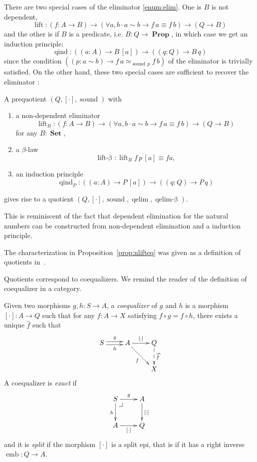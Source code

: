 \documentclass[envcountsame]{llncs}
\makeatletter
\providecommand{\class}[1]{[#1]}
\newcommand{\dlift}[1]{\widehat{#1}}
\DeclareMathOperator{\Prop}{\mathbf{Prop}}
\DeclareMathOperator{\Set}{\mathbf{Set}}
\DeclareMathOperator{\sound}{sound}
\DeclareMathOperator{\qelimbeta}{qelim-\beta}
\DeclareMathOperator{\qind}{qind}
\DeclareMathOperator{\emb}{emb}
\DeclareMathOperator{\qelim}{qelim}
\DeclareMathOperator{\lift}{lift}
\DeclareMathOperator{\liftbeta}{lift-\beta}
\newcommand{\pullbackcorner}[1][dr]{\save*!/#1-1.2pc/#1:(-1,1)@^{|-}\restore}
\makeatother
\begin{document}
There are two special cases of the eliminator \ref{enum:elim}. One is $B$ is not dependent,
 \[\lift\colon (f\colon A \to B) \to (\forall a,b\cdot a\sim b \to f\,a \equiv f\,b) \to (Q \to B)\]
and the other is if $B$ is a predicate, i.e. $B : Q\to \Prop$, in which case we get an induction principle:
\[\qind \colon((a\colon A)\to B \,\class a)\to ((q\colon Q)\to B\,q)\]
since the condition $((p:a\sim b) \to f\,a \simeq_{\sound\,p}f\,b) $  of  the eliminator is trivially satisfied.
On the other hand, these two special cases are sufficient to recover the eliminator :      


\begin{proposition}\label{prop:nlifteq}
A prequotient $(Q,\class\cdot,\sound)$ with 

\begin{enumerate}
\item a non-dependent eliminator $$\lift_B\colon (f\colon A \to B) \to (\forall a,b\cdot a\sim b \to f\,a \equiv f\,b) \to (Q \to B)$$ for any $B\colon\Set$,
\item a $\beta$-law $$\liftbeta : \lift_B f \,p\,\class a\equiv f a,$$
\item an induction principle $$\qind_P\colon ((a\colon A)\to P \,\class a)\to ((q\colon Q)\to P\,q)$$
\end{enumerate} 
gives rise to a quotient $(Q,\class\cdot,\sound,\qelim,\qelimbeta)$.
\end{proposition}
This is reminiscent of the fact that dependent elimination for the natural numbers can be constructed from non-dependent elimination and a induction principle.

The characterization in Proposition~\ref{prop:nlifteq} was given as a definition of quotients in~\cite{hofmann:thesis}.


Quotients correspond to coequalizers. We remind the reader of the definition of coequalizer in a category. 

\begin{definition}
Given two morphisms $g,h : S\to A$, a \emph{coequalizer} of $g$ and $h$ is a morphism $\class\cdot:A\to Q$ such that for any $f:A\to X$ satisfying $f \circ g = f \circ h$, there exists a unique $\dlift f$ such that  
\[\xymatrix{
S\ar@<0.5ex>[r]^g\ar@<-0.5ex>[r]_h& A\ar[r]^{\class\cdot}\ar[dr]_{f} & Q\ar@{-->}[d]^{\dlift f}\\
&&X
}\]
A coequalizer is \emph{exact} if 
\[\xymatrix{
S\pullbackcorner\ar[r]^g\ar[d]_h & A\ar[d]^{\class\cdot} \\
A\ar[r]_{\class\cdot} & Q
}\]
and it is \emph{split} if the morphism $\class\cdot$ is a split epi, that is if it has a right inverse $\emb : Q \to A$.
\end{definition}
\end{document}
